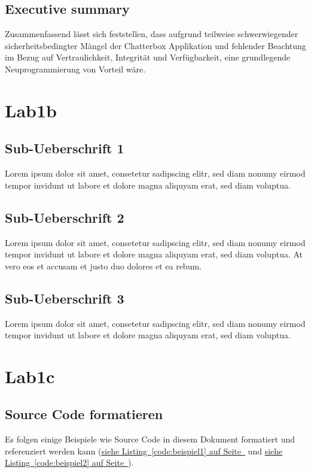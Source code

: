 \documentclass[12pt,a4paper,titlepage,oneside]{scrartcl}
\begin{document}
\subsection{Executive summary}
Zusammenfassend lässt sich feststellen, dass aufgrund teilweise schwerwiegender sicherheitsbedingter Mängel der Chatterbox Applikation und fehlender Beachtung im Bezug auf Vertraulichkeit, Integrität und Verfügbarkeit, eine grundlegende Neuprogrammierung von Vorteil wäre.
\section{Lab1b}

\subsection{Sub-Ueberschrift 1}
Lorem ipsum dolor sit amet, consetetur sadipscing elitr, sed diam nonumy eirmod tempor invidunt ut labore et dolore magna aliquyam erat, sed diam voluptua. 

\subsection{Sub-Ueberschrift 2}
Lorem ipsum dolor sit amet, consetetur sadipscing elitr, sed diam nonumy eirmod tempor invidunt ut labore et dolore magna aliquyam erat, sed diam voluptua. At vero eos et accusam et justo duo dolores et ea rebum. 

\subsection{Sub-Ueberschrift 3}
Lorem ipsum dolor sit amet, consetetur sadipscing elitr, sed diam nonumy eirmod tempor invidunt ut labore et dolore magna aliquyam erat, sed diam voluptua. 

\section{Lab1c}

\subsection{Source Code formatieren}
Es folgen einige Beispiele wie Source Code in diesem Dokument formatiert und referenziert werden kann
(\hyperref[code:beispiel1]{siehe Listing~\ref*{code:beispiel1} auf Seite~\pageref*{code:beispiel1}} und \hyperref[code:beispiel2]{siehe Listing~\ref*{code:beispiel2} auf Seite~\pageref*{code:beispiel2}}).
\end{document}
